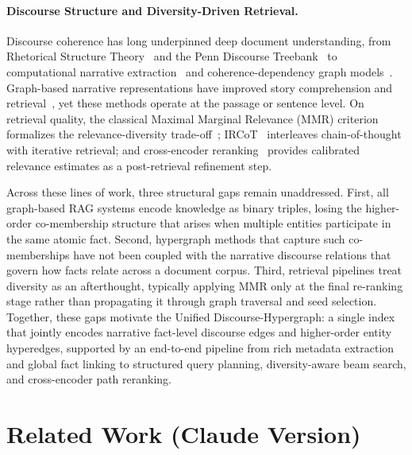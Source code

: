 \documentclass[runningheads]{llncs}
\begin{document}
\paragraph{Discourse Structure and Diversity-Driven Retrieval.}
Discourse coherence has long underpinned deep document understanding, from Rhetorical
Structure Theory~\cite{mann1988rhetorical} and the Penn Discourse Treebank~\cite{prasad2017penn} to
computational narrative extraction~\cite{santana2023survey} and coherence-dependency
graph models~\cite{xu2024graph}. Graph-based narrative representations have improved
story comprehension and retrieval~\cite{dekok:hal-04576222,andrus2022storykg}, yet these
methods operate at the passage or sentence level. On retrieval quality, the classical Maximal Marginal Relevance (MMR)
criterion~\cite{carbonell1998use} formalizes the relevance-diversity
trade-off~\cite{wu2022survey}; IRCoT~\cite{trivedi2023interleaving} interleaves
chain-of-thought with iterative retrieval; and cross-encoder reranking~\cite{nogueira2019passage}
provides calibrated relevance estimates as a post-retrieval refinement step.

Across these lines of work, three structural gaps remain unaddressed. First, all graph-based
RAG systems encode knowledge as binary triples, losing the higher-order co-membership
structure that arises when multiple entities participate in the same atomic fact. Second,
hypergraph methods that capture such co-memberships have not been coupled with the narrative
discourse relations that govern how facts relate across a document corpus. Third, retrieval
pipelines treat diversity as an afterthought, typically applying MMR only at the final
re-ranking stage rather than propagating it through graph traversal and seed selection.
Together, these gaps motivate the Unified Discourse-Hypergraph: a single index that jointly
encodes narrative fact-level discourse edges and higher-order entity hyperedges, supported
by an end-to-end pipeline from rich metadata extraction and global fact linking to
structured query planning, diversity-aware beam search, and cross-encoder path reranking.


\section{Related Work (Claude Version)}
\label{sec:related_claude}
\end{document}
